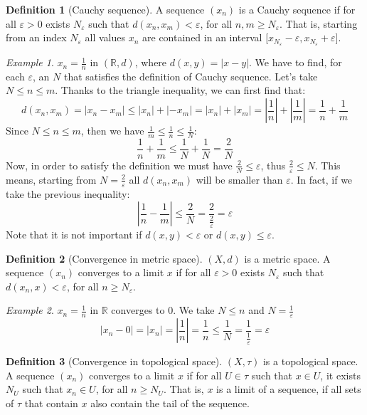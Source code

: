 \documentclass{article}
\newcommand{\abs}[1]{\left|#1\right|}
\newcommand{\fr}[2]{\frac{#1}{#2}}
\theoremstyle{definition}
\newtheorem{definition}{Definition}[section]
\theoremstyle{definition}
\theoremstyle{plain}
\theoremstyle{plain}
\theoremstyle{plain}
\theoremstyle{plain}
\theoremstyle{definition}
\theoremstyle{remark}
\newtheorem{exampled}{Example}[definition]
\theoremstyle{remark}
\theoremstyle{remark}
\theoremstyle{remark}
\newcommand{\R}{\mathbb{R}}
\newcommand{\E}{\varepsilon}
\begin{document}
\begin{definition}[Cauchy sequence]
  A sequence $(x_n)$ is a Cauchy sequence if for all $\E > 0$ exists $N_\E$ such that $d(x_n,x_m) < \E$, for all $n, m \geq N_\E$. That is, starting from an index $N_\E$ all values $x_n$ are contained in an interval ${[}x_{N_\E} - \E, x_{N_\E} + \E{]}$.
\end{definition}

\begin{exampled}
  $x_n = \fr{1}{n}$ in $(\R, d)$, where $d(x,y) = \abs{x - y}$. We have to find, for each $\E$, an $N$ that satisfies the definition of Cauchy sequence. Let's take $N \leq n \leq m$. Thanks to the triangle inequality, we can first find that:
  \[
  d(x_n,x_m) = \abs{x_n - x_m} \leq \abs{x_n} + \abs{-x_m} =
  \abs{x_n} + \abs{x_m} = \abs{\fr{1}{n}} + \abs{\fr{1}{m}} =
  \fr{1}{n} + \fr{1}{m}
  \]
  Since $N \leq n \leq m$, then we have $\fr{1}{m} \leq \fr{1}{n} \leq \fr{1}{N}$:
  \[
  \fr{1}{n} + \fr{1}{m} \leq
  \fr{1}{N} + \fr{1}{N} = \fr{2}{N}
  \]
  Now, in order to satisfy the definition we must have $\fr{2}{N} \leq \E$, thus $\fr{2}{\E} \leq N$. This means, starting from $N = \fr{2}{\E}$ all $d(x_n,x_m)$ will be smaller than $\E$. In fact, if we take the previous inequality:
  \[
  \abs{\fr{1}{n} - \fr{1}{m}} \leq
  \fr{2}{N} = \fr{2}{\fr{2}{\E}} = \E
  \]
  Note that it is not important if $d(x,y) < \E$ or $d(x,y) \leq \E$.
\end{exampled}


\begin{definition}[Convergence in metric space]
  $(X, d)$ is a metric space. A sequence $(x_n)$ converges to a limit $x$ if for all $\E > 0$ exists $N_\E$ such that $d(x_n,x) < \E$, for all $n \geq N_\E$.
\end{definition}

\begin{exampled}
  $x_n = \frac{1}{n}$ in $\R$ converges to 0. We take $N \leq n$ and $N = \frac{1}{\E}$
  \[
  \abs{x_n - 0} =
  \abs{x_n} =
  \abs{\frac{1}{n}} =
  \frac{1}{n} \leq
  \frac{1}{N} =
  \frac{1}{\frac{1}{\E}} =
  \E
  \]
\end{exampled}


\begin{definition}[Convergence in topological space]
  $(X, \tau)$ is a topological space. A sequence $(x_n)$ converges to a limit $x$ if for all $U \in \tau$ such that $x \in U$, it exists $N_U$ such that $x_n \in U$, for all $n \geq N_U$. That is, $x$ is a limit of a sequence, if all sets of $\tau$ that contain $x$ also contain the tail of the sequence.
\end{definition}
\end{document}
